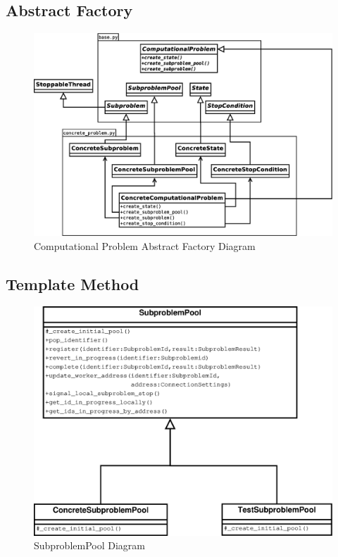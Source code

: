 \documentclass{article}
\begin{document}
\subsection{Abstract Factory}
\begin{figure}[H]
	\centering
	\includegraphics[width=\linewidth]{../diagrams/FactoryDiagram.eps}
	\caption{Computational Problem Abstract Factory Diagram}
\end{figure}

\subsection{Template Method}
\begin{figure}[H]
	\centering
	\includegraphics[width=\linewidth]{../diagrams/SubproblemPoolDiagram.eps}
	\caption{SubproblemPool Diagram}
\end{figure}
\end{document}
